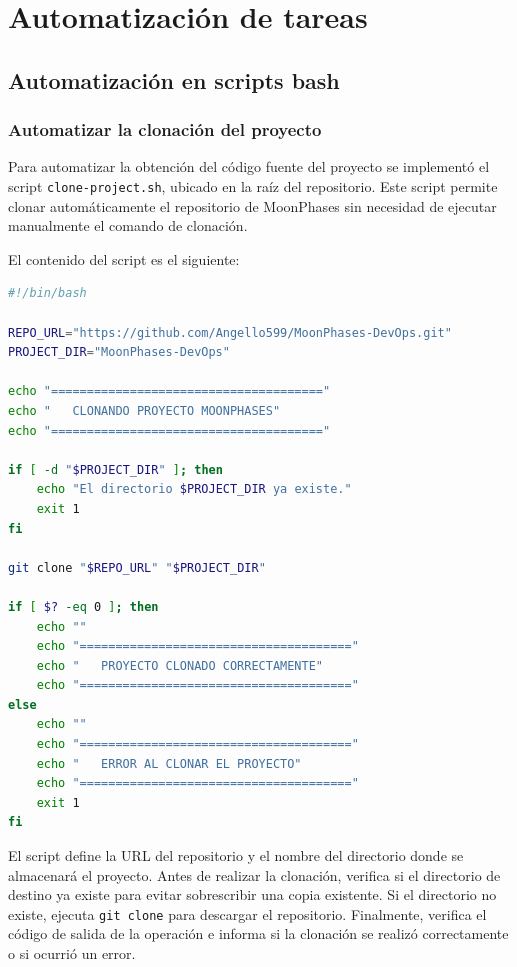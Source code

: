 \chapter{Automatización de tareas}

\section{Automatización en scripts bash}
\subsection{Automatizar la clonación del proyecto}

Para automatizar la obtención del código fuente del proyecto se implementó
el script \texttt{clone-project.sh}, ubicado en la raíz del repositorio.
Este script permite clonar automáticamente el repositorio de MoonPhases
sin necesidad de ejecutar manualmente el comando de clonación.

El contenido del script es el siguiente:

\begin{lstlisting}[language=bash]
#!/bin/bash

REPO_URL="https://github.com/Angello599/MoonPhases-DevOps.git"
PROJECT_DIR="MoonPhases-DevOps"

echo "======================================"
echo "   CLONANDO PROYECTO MOONPHASES"
echo "======================================"

if [ -d "$PROJECT_DIR" ]; then
    echo "El directorio $PROJECT_DIR ya existe."
    exit 1
fi

git clone "$REPO_URL" "$PROJECT_DIR"

if [ $? -eq 0 ]; then
    echo ""
    echo "======================================"
    echo "   PROYECTO CLONADO CORRECTAMENTE"
    echo "======================================"
else
    echo ""
    echo "======================================"
    echo "   ERROR AL CLONAR EL PROYECTO"
    echo "======================================"
    exit 1
fi
\end{lstlisting}

El script define la URL del repositorio y el nombre del directorio donde se
almacenará el proyecto. Antes de realizar la clonación, verifica si el
directorio de destino ya existe para evitar sobrescribir una copia
existente. Si el directorio no existe, ejecuta \texttt{git clone} para
descargar el repositorio. Finalmente, verifica el código de salida de la
operación e informa si la clonación se realizó correctamente o si ocurrió
un error.

